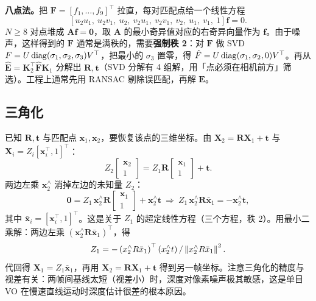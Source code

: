 \textbf{八点法。}把 $\bm{F}=[f_1,\dots,f_9]^{\top}$ 拉直，每对匹配点给一个线性方程
\begin{equation}
  \left[u_2u_1,\ u_2v_1,\ u_2,\ v_2u_1,\ v_2v_1,\ v_2,\ u_1,\ v_1,\ 1\right]\bm{f}=0.
\end{equation}
$N\ge8$ 对点堆成 $\bm{A}\bm{f}=\bm{0}$，取 $\bm{A}$ 的最小奇异值对应的右奇异向量作为 $\bm{f}$。由于噪声，这样得到的 $\bm{F}$ 通常是满秩的，需要\textbf{强制秩 2}：对 $\bm{F}$ 做 SVD $F=U\operatorname{diag}(\sigma_1,\sigma_2,\sigma_3)V^{\top}$，把最小的 $\sigma_3$ 置零，得 $\hat{F}=U\operatorname{diag}(\sigma_1,\sigma_2,0)V^{\top}$。再从 $\hat{\bm{E}}=\bm{K}_2^{\top}\hat{\bm{F}}\bm{K}_1$ 分解出 $\bm{R},\bm{t}$（SVD 分解有 4 组解，用「点必须在相机前方」筛选）。工程上通常先用 RANSAC 剔除误匹配，再解 $\bm{E}$。

\subsection{三角化}

已知 $\bm{R},\bm{t}$ 与匹配点 $\bm{x}_1,\bm{x}_2$，要恢复该点的三维坐标。由 $\bm{X}_2=\bm{R}\bm{X}_1+\bm{t}$ 与 $\bm{X}_i=Z_i[\bm{x}_i^{\top},1]^{\top}$：
\begin{equation}
  Z_2\begin{bmatrix}\bm{x}_2\\1\end{bmatrix}
  = Z_1\bm{R}\begin{bmatrix}\bm{x}_1\\1\end{bmatrix}+\bm{t}.
  \label{eq:08-triangulate}
\end{equation}
两边左乘 $\bm{x}_2^{\wedge}$ 消掉左边的未知量 $Z_2$：
\begin{equation}
  \bm{0} = Z_1\,\bm{x}_2^{\wedge}\bm{R}\begin{bmatrix}\bm{x}_1\\1\end{bmatrix}
  +\bm{x}_2^{\wedge}\bm{t}
  \ \Longrightarrow\
  Z_1\,\bm{x}_2^{\wedge}\bm{R}\bar{\bm{x}}_1 = -\bm{x}_2^{\wedge}\bm{t},
  \label{eq:08-tri-ls}
\end{equation}
其中 $\bar{\bm{x}}_i=[\bm{x}_i^{\top},1]^{\top}$。这是关于 $Z_1$ 的超定线性方程（三个方程，秩 2）。用最小二乘解：两边左乘 $(\bm{x}_2^{\wedge}\bm{R}\bar{\bm{x}}_1)^{\top}$，得
\begin{equation}
  Z_1 = -\left(x_2^{\wedge}R\bar{x}_1\right)^{\top}\left(x_2^{\wedge}t\right)/\left\lVert x_2^{\wedge}R\bar{x}_1 \right\rVert^{2}.
  \label{eq:08-Z1}
\end{equation}
代回得 $\bm{X}_1=Z_1\bar{\bm{x}}_1$，再用 $\bm{X}_2=\bm{R}\bm{X}_1+\bm{t}$ 得到另一帧坐标。注意三角化的精度与视差有关：两帧间基线太短（视差小）时，深度对像素噪声极其敏感，这是单目 VO 在慢速直线运动时深度估计很差的根本原因。

